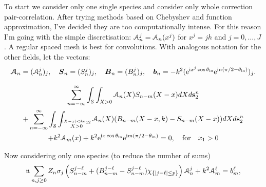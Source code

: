\documentclass[12pt, a4paper]{article}
\begin{document}
To start we consider only one single species and consider only whole correction pair-correlation. After trying methods based on Chebyshev and function approximation, I've decided they are too computationally intense. For this reason I'm going with the simple discretisation: $\mathcal A_n^j = \mathcal A_n (x^j)$ for $x^j = j h$ and $j=0,\ldots,J$. A regular spaced mesh is best for convolutions. With analogous notation for the other fields, let the vectors:
\begin{equation}
  \boldsymbol{\mathcal A}_n = (\mathcal A_n^j)_j, \quad \boldsymbol{S}_n = (S_n^j)_j, \quad \boldsymbol{B}_n = (B_n^j)_j, \quad \boldsymbol{b}_n = - k^2(\textrm{e}^{ \textrm{i} x^j \cos \theta_{\mathrm{in}}} \textrm{e}^{\textrm{i} n ( \pi/2 - \theta_{\mathrm{in}} )})_j.
  \label{eqns:discretisation}
\end{equation}


\begin{multline}
  \sum_{n=-\infty}^\infty
  \int_\mathcal S \int_{X>0} \mathcal A_n (X) S_{n-m}(X-x) dX
  d\mathbf s_2^n
  \\
  +  \sum_{n=-\infty}^\infty
    \int_\mathcal S \int_{\stackrel{|X-x| < k a_{12}}{X>0}} \mathcal A_n (X) (B_{n-m}(X- x,k) - S_{n-m}(X-x) )dX
    d\mathbf s_2^n
\\
+  k^2 \mathcal A_m (x)   + k^2  \textrm{e}^{\textrm{i} x \cos \theta_{\mathrm{in}}} \textrm{e}^{\textrm{i} m ( \pi/2 - \theta_{\mathrm{in}} )}
   = 0, \quad \text{for} \quad x_1 >0
  \label{eqn:ensemAsystem4}
\end{multline}

Now considering only one species (to reduce the number of sums)
\begin{equation}
  \mathfrak n_{} \sum_{n,j \geq 0}  Z_n  \sigma_j  \left ( S_{n-m}^{j-\ell}
  +  (B_{n-m}^{j-\ell} - S_{n-m}^{j -\ell} ) \chi_{\{|j-\ell|\leq p\}} \right) \mathcal A_n^j+  k^2  \mathcal A_m^\ell  =  b_m^\ell,
  \label{eqn:ensemAsystemN}
\end{equation}
\end{document}
